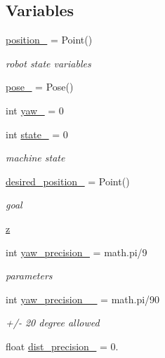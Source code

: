 \subsection*{Variables}
\begin{DoxyCompactItemize}
\item 
\hyperlink{namespacego__to__point__action_a4aafc5721803ca4d208e9e0a686f8e65}{position\+\_\+} = Point()
\begin{DoxyCompactList}\small\item\em robot state variables \end{DoxyCompactList}\item 
\hyperlink{namespacego__to__point__action_ac843a0e43a672ed873017530721ce2d9}{pose\+\_\+} = Pose()
\item 
int \hyperlink{namespacego__to__point__action_a880fb089b41232984ae49355b6f46a39}{yaw\+\_\+} = 0
\item 
int \hyperlink{namespacego__to__point__action_aadf404dc66c95a101e7e05dfafd92c3d}{state\+\_\+} = 0
\begin{DoxyCompactList}\small\item\em machine state \end{DoxyCompactList}\item 
\hyperlink{namespacego__to__point__action_a57e8782cf693baab2ca4390e2e917155}{desired\+\_\+position\+\_\+} = Point()
\begin{DoxyCompactList}\small\item\em goal \end{DoxyCompactList}\item 
\hyperlink{namespacego__to__point__action_a8848541ff0d9e1607e1d715de007aa03}{z}
\item 
int \hyperlink{namespacego__to__point__action_a914253ff638fc05f3f0fd3d9536503c2}{yaw\+\_\+precision\+\_\+} = math.\+pi/9
\begin{DoxyCompactList}\small\item\em parameters \end{DoxyCompactList}\item 
int \hyperlink{namespacego__to__point__action_a65f4bbc971a7e33d9441aa79dcbfa1ae}{yaw\+\_\+precision\+\_\+\_\+} = math.\+pi/90
\begin{DoxyCompactList}\small\item\em +/-\/ 20 degree allowed \end{DoxyCompactList}\item 
float \hyperlink{namespacego__to__point__action_a2b67a832bde842bf565341c5fc606f81}{dist\+\_\+precision\+\_\+} = 0.

\end{DoxyCompactItemize}
